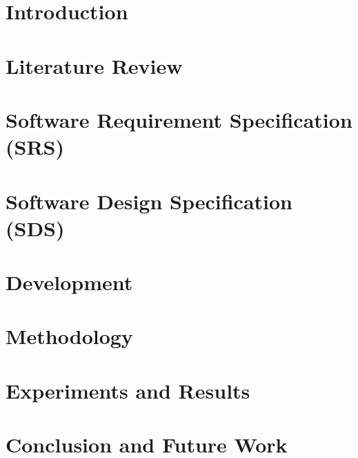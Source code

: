 \documentclass[12pt,twosided]{report}
\begin{document}
\tableofcontents
\listoffigures
\listoftables

\chapter{Introduction}
\label{chap:intro}


\chapter{Literature Review}
\label{chap:lit}


\chapter{Software Requirement Specification (SRS)}
\label{chap:srs}


\chapter{Software Design Specification (SDS)}
\label{chap:sds}


\chapter{Development}
\label{chap:dev}


\chapter{Methodology}
\label{chap:method}


\chapter{Experiments and Results}
\label{chap:results}



\chapter{Conclusion and Future Work}
\label{chap:outro}

\end{document}
